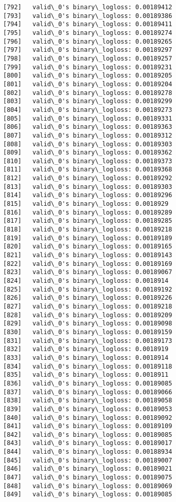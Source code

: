\documentclass[11pt]{article}
\begin{document}
\begin{Verbatim}[commandchars=\\\{\}]
[792]	valid\_0's binary\_logloss: 0.00189412
[793]	valid\_0's binary\_logloss: 0.00189386
[794]	valid\_0's binary\_logloss: 0.00189411
[795]	valid\_0's binary\_logloss: 0.00189274
[796]	valid\_0's binary\_logloss: 0.00189265
[797]	valid\_0's binary\_logloss: 0.00189297
[798]	valid\_0's binary\_logloss: 0.00189257
[799]	valid\_0's binary\_logloss: 0.00189231
[800]	valid\_0's binary\_logloss: 0.00189205
[801]	valid\_0's binary\_logloss: 0.00189204
[802]	valid\_0's binary\_logloss: 0.00189278
[803]	valid\_0's binary\_logloss: 0.00189299
[804]	valid\_0's binary\_logloss: 0.00189273
[805]	valid\_0's binary\_logloss: 0.00189331
[806]	valid\_0's binary\_logloss: 0.00189363
[807]	valid\_0's binary\_logloss: 0.00189312
[808]	valid\_0's binary\_logloss: 0.00189303
[809]	valid\_0's binary\_logloss: 0.00189362
[810]	valid\_0's binary\_logloss: 0.00189373
[811]	valid\_0's binary\_logloss: 0.00189368
[812]	valid\_0's binary\_logloss: 0.00189292
[813]	valid\_0's binary\_logloss: 0.00189303
[814]	valid\_0's binary\_logloss: 0.00189296
[815]	valid\_0's binary\_logloss: 0.0018929
[816]	valid\_0's binary\_logloss: 0.00189289
[817]	valid\_0's binary\_logloss: 0.00189285
[818]	valid\_0's binary\_logloss: 0.00189218
[819]	valid\_0's binary\_logloss: 0.00189189
[820]	valid\_0's binary\_logloss: 0.00189165
[821]	valid\_0's binary\_logloss: 0.00189143
[822]	valid\_0's binary\_logloss: 0.00189169
[823]	valid\_0's binary\_logloss: 0.00189067
[824]	valid\_0's binary\_logloss: 0.0018914
[825]	valid\_0's binary\_logloss: 0.00189192
[826]	valid\_0's binary\_logloss: 0.00189226
[827]	valid\_0's binary\_logloss: 0.00189218
[828]	valid\_0's binary\_logloss: 0.00189209
[829]	valid\_0's binary\_logloss: 0.00189098
[830]	valid\_0's binary\_logloss: 0.00189159
[831]	valid\_0's binary\_logloss: 0.00189173
[832]	valid\_0's binary\_logloss: 0.0018919
[833]	valid\_0's binary\_logloss: 0.0018914
[834]	valid\_0's binary\_logloss: 0.00189118
[835]	valid\_0's binary\_logloss: 0.0018911
[836]	valid\_0's binary\_logloss: 0.00189085
[837]	valid\_0's binary\_logloss: 0.00189066
[838]	valid\_0's binary\_logloss: 0.00189058
[839]	valid\_0's binary\_logloss: 0.00189053
[840]	valid\_0's binary\_logloss: 0.00189092
[841]	valid\_0's binary\_logloss: 0.00189109
[842]	valid\_0's binary\_logloss: 0.00189085
[843]	valid\_0's binary\_logloss: 0.00189017
[844]	valid\_0's binary\_logloss: 0.00188934
[845]	valid\_0's binary\_logloss: 0.00189007
[846]	valid\_0's binary\_logloss: 0.00189021
[847]	valid\_0's binary\_logloss: 0.00189075
[848]	valid\_0's binary\_logloss: 0.00189069
[849]	valid\_0's binary\_logloss: 0.00189085

\end{Verbatim}
\end{document}
